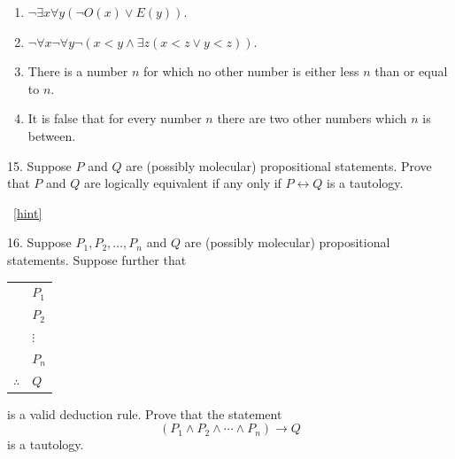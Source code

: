 \documentclass[10pt,]{book}
\theoremstyle{plain}
\theoremstyle{definition}
\theoremstyle{definition}
\theoremstyle{definition}
\numberwithin{equation}{chapter}
\newcommand{\hrulethin}  {\noalign{\hrule height 0.04em}}
\def\iff{\leftrightarrow}
\def\imp{\rightarrow}
\newcommand{\lt}{<}
\begin{document}
\begin{exerciselist}
\begin{enumerate}[label=(\alph*)]
\item\hypertarget{li-496}{}\(\neg \exists x \forall y (\neg O(x) \vee E(y))\).%
\item\hypertarget{li-497}{}\(\neg \forall x \neg \forall y \neg(x \lt  y \wedge \exists z (x \lt  z \vee y \lt  z))\).%
\item\hypertarget{li-498}{}\hypertarget{p-2392}{}%
There is a number \(n\) for which no other number is either less \(n\) than or equal to \(n\).%
\item\hypertarget{li-499}{}\hypertarget{p-2393}{}%
It is false that for every number \(n\) there are two other numbers which \(n\) is between.%
\end{enumerate}
%
\par\smallskip
\item[15.]\hypertarget{exercise-113}{}\hypertarget{p-2397}{}%
Suppose \(P\) and \(Q\) are (possibly molecular) propositional statements.  Prove that \(P\) and \(Q\) are logically equivalent if any only if \(P \iff Q\) is a tautology.%
\par\smallskip
~\hfill{\tiny\hyperlink{a-B.4.15}{[hint]}\hypertarget{q-B.4.15}{}}\item[16.]\hypertarget{exercise-114}{}\hypertarget{p-2399}{}%
Suppose \(P_1, P_2, \ldots, P_n\) and \(Q\) are (possibly molecular) propositional statements.  Suppose further that%
\begin{sidebyside}{1}{0}{0}{0}
\begin{sbspanel}{1}
{\centering%
\begin{tabular}{ll}
&\(P_1\)\tabularnewline[0pt]
&\(P_2\)\tabularnewline[0pt]
&\(\vdots\)\tabularnewline[0pt]
&\(P_n\)\tabularnewline\hrulethin
\(\therefore\)&\(Q\)
\end{tabular}
\par}
\end{sbspanel}
\end{sidebyside}
\par
\hypertarget{p-2400}{}%
is a valid deduction rule.  Prove that the statement%
\begin{equation*}
(P_1 \wedge P_2 \wedge \cdots \wedge P_n) \imp Q
\end{equation*}
is a tautology.%
\par\smallskip
\end{exerciselist}
\typeout{************************************************}
\typeout{************************************************}
\end{document}
